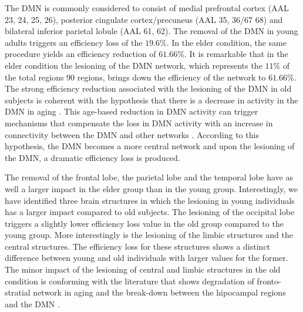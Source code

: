 \documentclass[12pt,a4paper]{article}
\begin{document}
The DMN is commonly considered to consist of medial prefrontal cortex
(AAL 23, 24, 25, 26), posterior cingulate cortex/precuneus (AAL 35, 36/67 68)
and bilateral inferior parietal lobule (AAL 61, 62). 
The removal of the DMN in
young adults triggers an efficiency loss of the $19.6\%$. In the elder condition, the same procedure yields an efficiency reduction of $61.66\%$. It is remarkable that in the elder condition the lesioning of the DMN network, which represents the $11\%$ of the total regions 90 regions, brings down the efficiency of the network to $61.66\%$.
The strong efficiency reduction associated with the lesioning of the DMN in old subjects is coherent with the hypothesis that there is a decrease in activity in the DMN in aging \cite{koch_effects_2010}. This age-based reduction in DMN activity can trigger mechanisms that compensate the loss in DMN activity with an increase in connectivity between the DMN and other networks \cite{damoiseaux_reduced_2008}. According to this hypothesis, the DMN becomes a more central network and upon the lesioning of the DMN, a dramatic efficiency loss is produced. 


The removal of the frontal lobe, the parietal lobe and the temporal lobe have as well a larger impact in the elder group than in the young group. 
Interestingly, we have identified three brain structures in which the lesioning in young individuals has a larger impact compared to old subjects. The lesioning of the occipital lobe triggers a slightly lower efficiency loss value in the old group compared to the young group. More interestingly is the lesioning of the limbic structures and the central structures. The efficiency loss for these structures shows a distinct difference between young and old individuals with larger values for the former. The minor impact of the lesioning of central and limbic structures in the old condition is conforming with the literature that shows degradation of fronto-stratial network in aging \cite{salami_elevated_2014} and the break-down between the hipocampal regions and the DMN \cite{fjell_brain_2015}. 
\end{document}
